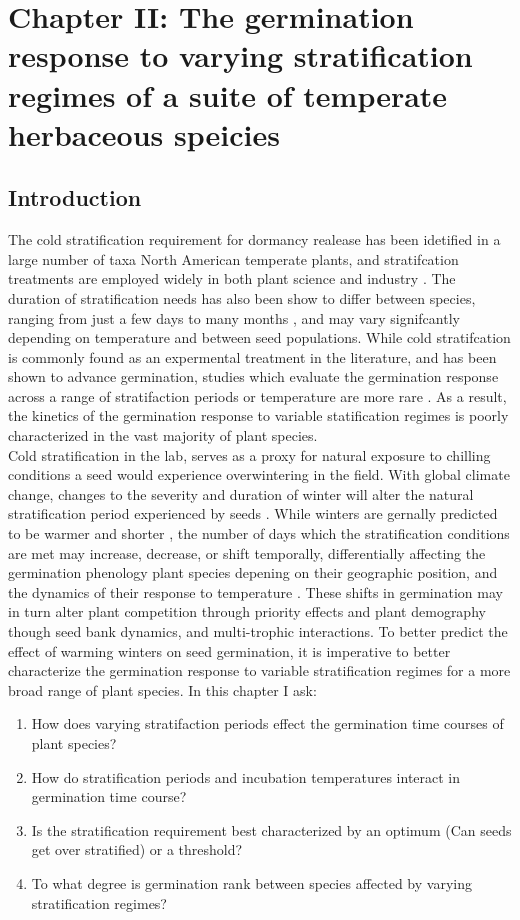 \documentclass{article}\usepackage[]{graphicx}\usepackage[]{color}
\begin{document}
\section*{Chapter II: The germination response to varying stratification regimes of a suite of temperate herbaceous speicies}
\subsection{Introduction}
 The cold stratification requirement for dormancy realease has been idetified in a large number of taxa North American temperate plants, and stratifcation treatments are employed widely in both plant science and industry \citep{Hartmann_2011}. The duration of stratification needs has also been show to differ between species, ranging from just a few days to many months \citep{}, and may vary signifcantly depending on temperature \citep{Steadman2004} and between seed populations. While cold stratifcation is commonly found as an expermental treatment in the literature, and has been shown to advance germination, studies which evaluate the germination response across a range of stratifaction periods or temperature are more rare \citep{Batlla2009}. As a result, the kinetics of the germination response to variable statification regimes is poorly characterized in the vast majority of plant species.\\
\indent Cold stratification in the lab, serves as a proxy for natural exposure to chilling conditions a seed would experience overwintering in the field. With global climate change, changes to the severity and duration of winter will alter the natural stratification period experienced by seeds \citep{Walck2011}. While winters are gernally predicted to be warmer and shorter \citep{IPCC}, the number of days which the stratification conditions are met may increase, decrease, or shift temporally, differentially affecting the germination phenology plant species depening on their geographic position, and the dynamics of their response to temperature \citep{Walck2011}. These shifts in germination may in turn alter plant competition through priority effects \citep{} and plant demography though seed bank dynamics, and multi-trophic interactions.
\indent To better predict the effect of warming winters on seed germination, it is imperative to better characterize the germination response to variable stratification regimes for a more broad range of plant species. In this chapter I ask:
\begin{enumerate}
\item How does varying stratifaction periods effect the germination time courses of plant species?
\item How do stratification periods and incubation temperatures interact in germination time course?
\item Is the stratification requirement best characterized by an optimum (Can seeds get over stratified) or a threshold?
\item To what degree is germination rank between species affected by varying stratification regimes?
\end{enumerate}
\end{document}
